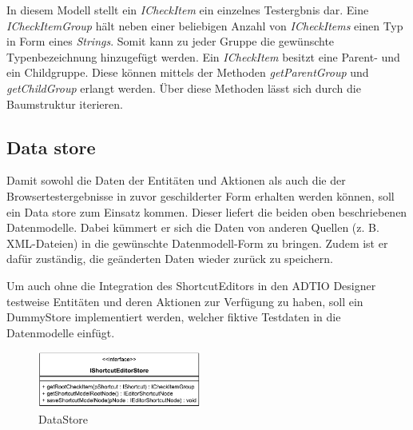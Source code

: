 In diesem Modell stellt ein \emph{ICheckItem} ein einzelnes Testergbnis dar. Eine \emph{ICheckItemGroup} hält neben einer beliebigen Anzahl von \emph{ICheckItems} einen Typ in Form eines \emph{Strings}. Somit kann zu jeder Gruppe die gewünschte Typenbezeichnung hinzugefügt werden. Ein \emph{ICheckItem} besitzt eine Parent- und ein Childgruppe. Diese können mittels der Methoden \emph{getParentGroup} und \emph{getChildGroup} erlangt werden. Über diese Methoden lässt sich durch die Baumstruktur iterieren.

\vspace{-5px}

\subsection{Data store}

Damit sowohl die Daten der Entitäten und Aktionen als auch die der Browsertestergebnisse in zuvor geschilderter Form erhalten werden können, soll ein Data store zum Einsatz kommen. Dieser liefert die beiden oben beschriebenen Datenmodelle. Dabei kümmert er sich die Daten von anderen Quellen (z. B. XML-Dateien) in die gewünschte Datenmodell-Form zu bringen. Zudem ist er dafür zuständig, die geänderten Daten wieder zurück zu speichern.

Um auch ohne die Integration des ShortcutEditors in den ADTIO Designer testweise Entitäten und deren Aktionen zur Verfügung zu haben, soll ein DummyStore implementiert werden, welcher fiktive Testdaten in die Datenmodelle einfügt.

\vfill

\begin{figure}[H]
	\centering
	\includegraphics[height=70px]{../graphic/diagrams/CD_IShortcutEditorStore/IShortcutEditorStore}
	\caption{DataStore}
	\label{fig:ishortcuteditorstore}
\end{figure}



\newpage
